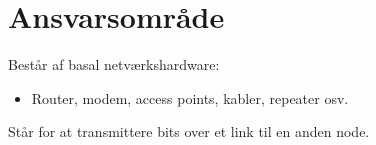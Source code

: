 \section{Ansvarsområde}
Består af basal netværkshardware:
\begin{itemize}
	\item Router, modem, access points, kabler, repeater osv.
\end{itemize}

Står for at transmittere bits over et link til en anden node.
